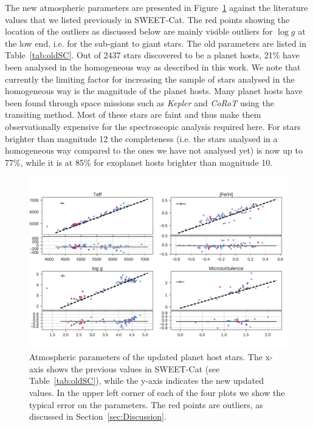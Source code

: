 \documentclass{aa}
\begin{document}
The new atmospheric parameters are presented in Figure~\ref{fig:update} against
the literature values that we listed previously in SWEET-Cat. The red points
showing the location of the outliers as discussed below are mainly visible
outliers for $\log g$ at the low end, i.e. for the sub-giant to giant stars. The
old parameters are listed in Table~\ref{tab:oldSC}. Out of 2437 stars discovered
to be a planet hosts, 21\% have been analysed in the homogeneous way as
described in this work. We note that currently the limiting factor for
increasing the sample of stars analysed in the homogeneous way is the magnitude
of the planet hosts. Many planet hosts have been found through space missions
such as \emph{Kepler} and \emph{CoRoT} using the transiting method. Most of
these stars are faint and thus make them observationally expensive for the
spectroscopic analysis required here. For stars brighter than magnitude 12 the
completeness (i.e. the stars analysed in a homogeneous way compared to the ones
we have not analysed yet) is now up to 77\%, while it is at 85\% for exoplanet
hosts brighter than magnitude 10.

\begin{figure}[tpb]
    \centering
    \includegraphics[width=1.0\linewidth,natwidth=870,natheight=580]{figures/update.pdf}
    \caption{Atmospheric parameters of the updated planet host stars. The x-axis
    shows the previous values in SWEET-Cat (see Table~\ref{tab:oldSC}), while the
    y-axis indicates the new updated values. In the upper left corner of each of the
    four plots we show the typical error on the parameters. The red points
    are outliers, as discussed in Section~\ref{sec:Discussion}.}
    \label{fig:update}
\end{figure}
\end{document}
